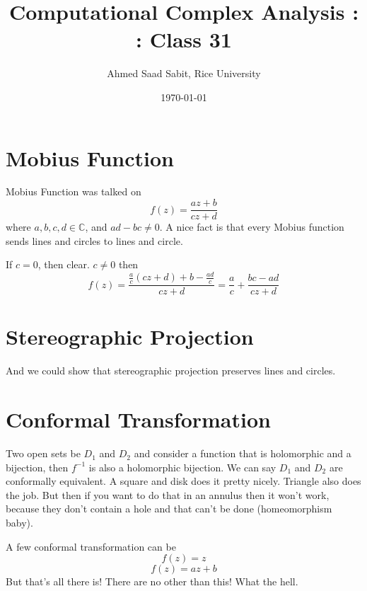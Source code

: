 \documentclass[letter]{article}
\title{Computational Complex Analysis : : Class 31}
\author{Ahmed Saad Sabit, Rice University}
\date{\today}
\begin{document}
\maketitle
\section*{Mobius Function} 

Mobius Function was talked on 
\[
f(z) = \frac{az + b}{cz + d}
\] 
where $a,b,c,d \in \mathbb{C}$, and $ad - bc \neq  0$. A nice fact is that every Mobius function sends lines and circles to lines and circle. 

If $c = 0$, then clear. $c \neq  0 $ then 
\[
f(z) = \frac{\frac{a}{c} \left(cz + d\right) + b - \frac{ad }{c } }{cz +d } = \frac{a}{c} + \frac{bc - ad}{cz + d}
\] 

\section*{Stereographic Projection} 
And we could show that stereographic projection preserves lines and circles.

\section*{Conformal Transformation}
Two open sets be $D_1$ and $D_2$ and consider a function that is holomorphic and a bijection, then $f^{-1}$ is also a holomorphic bijection. We can say $D_1$ and $D_2$ are conformally equivalent. A square and disk does it pretty nicely. Triangle also does the job. But then if you want to do that in an annulus then it won't work, because they don't contain a hole and that can't be done (homeomorphism baby). 

A few conformal transformation can be 
\[
f(z) = z
\] 
\[
f(z) = az + b
\] 
But that's all there is! There are no other than this! What the hell. 
\end{document}
